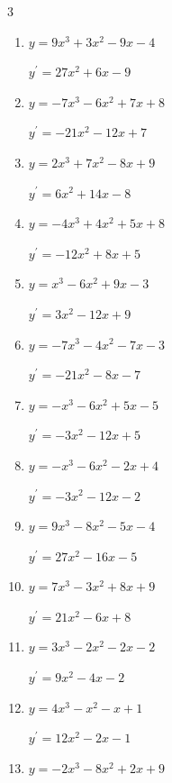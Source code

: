 \begin{multicols}{3}
\begin{enumerate}
        $\displaystyle y^{\prime}=-9x^{2}+2x$

  \item $y=9x^{3}+3x^{2}-9x-4$

        $\displaystyle y^{\prime}=27x^{2}+6x-9$

  \item $y=-7x^{3}-6x^{2}+7x+8$

        $\displaystyle y^{\prime}=-21x^{2}-12x+7$

  \item $y=2x^{3}+7x^{2}-8x+9$

        $\displaystyle y^{\prime}=6x^{2}+14x-8$

  \item $y=-4x^{3}+4x^{2}+5x+8$

        $\displaystyle y^{\prime}=-12x^{2}+8x+5$

  \item $y=x^{3}-6x^{2}+9x-3$

        $\displaystyle y^{\prime}=3x^{2}-12x+9$

  \item $y=-7x^{3}-4x^{2}-7x-3$

        $\displaystyle y^{\prime}=-21x^{2}-8x-7$

  \item $y=-x^{3}-6x^{2}+5x-5$

        $\displaystyle y^{\prime}=-3x^{2}-12x+5$

  \item $y=-x^{3}-6x^{2}-2x+4$

        $\displaystyle y^{\prime}=-3x^{2}-12x-2$

  \item $y=9x^{3}-8x^{2}-5x-4$

        $\displaystyle y^{\prime}=27x^{2}-16x-5$

  \item $y=7x^{3}-3x^{2}+8x+9$

        $\displaystyle y^{\prime}=21x^{2}-6x+8$

  \item $y=3x^{3}-2x^{2}-2x-2$

        $\displaystyle y^{\prime}=9x^{2}-4x-2$

  \item $y=4x^{3}-x^{2}-x+1$

        $\displaystyle y^{\prime}=12x^{2}-2x-1$

  \item $y=-2x^{3}-8x^{2}+2x+9$


\end{enumerate}
\end{multicols}
